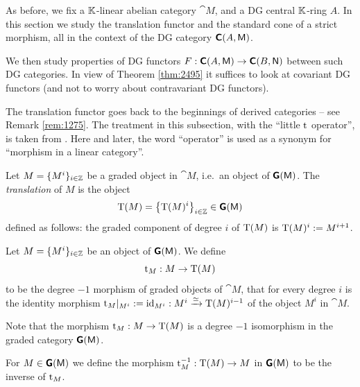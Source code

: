 \cleardoublepage
{} \label{sec:stand-tri}

\AYcopyright

As before, we fix a $\mathbb{K}$-linear abelian category $\cat{M}$,  and a
DG central $\mathbb{K}$-ring $A$. In this section we study the translation functor and 
the standard cone of a strict morphism, all in the context of the DG category 
$\boldsymbol{\mathsf{C}}(A, \operatorname{\mathsf{M}})$. 

We then study properties of DG functors 
$F : \boldsymbol{\mathsf{C}}(A, \operatorname{\mathsf{M}}) \to \boldsymbol{\mathsf{C}}(B, \operatorname{\mathsf{N}})$
between such DG categories. In view of Theorem \ref{thm:2495} it suffices to 
look at covariant DG functors (and not to worry about contravariant DG 
functors). 


 \label{subsec:translation}

The translation functor goes back to the beginnings of derived categories -- 
see Remark \ref{rem:1275}. The treatment in this subsection, with the
``little $\operatorname{t}$ operator'',  is taken from \cite[Section 1]{Ye9}. 
Here and later, the word ``operator'' is used as a 
synonym for ``morphism in a linear category''. 

\begin{dfn} \label{dfn:1260}
Let $M = \{ M^i \}_{i \in \mathbb{Z}}$ be a graded object in $\cat{M}$, i.e.\ an 
object of $\boldsymbol{\mathsf{G}}(\operatorname{\mathsf{M}})$. The {\em translation}
of $M$ is the object 
\[ \operatorname{T}(M) = \bigl\{ \operatorname{T}(M)^i \bigr\}_{i \in \mathbb{Z}} \in \boldsymbol{\mathsf{G}}(\operatorname{\mathsf{M}}) \]
defined as follows: the graded component of degree $i$ of $\operatorname{T}(M)$ is
$\operatorname{T}(M)^i := M^{i + 1}$.
\end{dfn}

\begin{dfn} \label{dfn:1261}
Let $M = \{ M^i \}_{i \in \mathbb{Z}}$ be an object of $\boldsymbol{\mathsf{G}}(\operatorname{\mathsf{M}})$. We define 
\[ \operatorname{t}_M : M \to \operatorname{T}(M) \]
%
to be the degree $-1$ morphism of graded objects of $\cat{M}$, that for every 
degree $i$ is the identity morphism
${\operatorname{t}_M}|_{M^{i}} := \operatorname{id}_{M^{i}} :  M^{i} \xrightarrow{\simeq} \operatorname{T}(M)^{i - 1}$
of the object $M^{i}$ in $\cat{M}$.
\end{dfn}

Note that the morphism 
$\operatorname{t}_M : M \to \operatorname{T}(M)$ is a degree $-1$ isomorphism in the graded 
category $\boldsymbol{\mathsf{G}}(\operatorname{\mathsf{M}})$. 

\begin{dfn} \label{dfn:2300}
For $M \in \boldsymbol{\mathsf{G}}(\operatorname{\mathsf{M}})$ we define the morphism 
$\operatorname{t}_M^{-1} : \operatorname{T}(M) \to M$
in $\boldsymbol{\mathsf{G}}(\operatorname{\mathsf{M}})$ to be the inverse of $\operatorname{t}_M$. 
\end{dfn}

